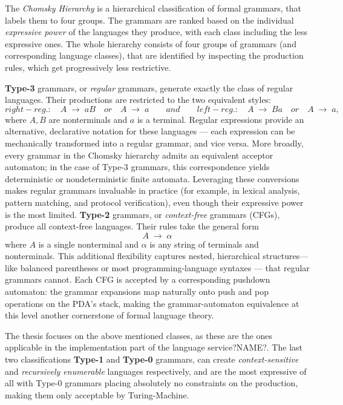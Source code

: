 \documentclass[11pt]{report}
\begin{document}
The \textit{Chomsky Hierarchy} is a hierarchical classification of formal grammars, that labels them to four groups. The grammars are ranked based on the
individual \textit{expressive power} of the languages they produce, with each class including the less expressive ones. The whole hierarchy consists of four
groups of grammars (and corresponding language classes), that are identified by inspecting the production rules, which get progressively less restrictive.

\textbf{Type-3} grammars, or \emph{regular} grammars, generate exactly the class of regular languages. Their productions are restricted to the two equivalent styles:  
\[
right-reg.: \quad A \;\to\; aB \quad or \quad A \;\to\; a
\qquad and \qquad
left-reg.: \quad A \;\to\; Ba \quad or \quad A \;\to\; a,
\]
where \(A,B\) are nonterminals and \(a\) is a terminal. Regular expressions provide an alternative, declarative notation for these languages — each expression
can be mechanically transformed into a regular grammar, and vice versa. More broadly, every grammar in the Chomsky hierarchy admits an equivalent acceptor automaton;
in the case of Type-3 grammars, this correspondence yields deterministic or nondeterministic finite automata. Leveraging these conversions makes regular grammars
invaluable in practice (for example, in lexical analysis, pattern matching, and protocol verification), even though their expressive power is the most limited.
\textbf{Type-2} grammars, or \emph{context-free} grammars (CFGs), produce all context-free languages.
Their rules take the general form  \[A \;\to\; \alpha\] where \(A\) is a single nonterminal and \(\alpha\) is any string of terminals and nonterminals.
This additional flexibility captures nested, hierarchical structures—like balanced parentheses or most programming‐language syntaxes — that regular grammars cannot.
Each CFG is accepted by a corresponding pushdown automaton: the grammar expansions map naturally onto push and pop operations on the PDA’s stack, making the grammar-automaton
equivalence at this level another cornerstone of formal language theory.

The thesis focuses on the above mentioned classes, as these are the ones applicable in the implementation part of the language service?NAME?. The last two classifications
\textbf{Type-1} and \textbf{Type-0} grammars, can create \textit{context-sensitive} and \textit{recursively enumerable} languages respectively, and are the most expressive
of all with Type-0 grammars placing absolutely no constraints on the production, making them only acceptable by Turing-Machine.
\end{document}

